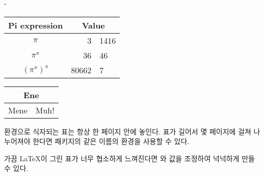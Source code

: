\begin{adjustwidth}{0pt}{-\margheadwidth}

\begin{example}
\begin{tabular}{c r @{.} l}
Pi expression       &
\multicolumn{2}{c}{Value} \\
\hline
$\pi$               & 3&1416  \\
$\pi^{\pi}$         & 36&46   \\
$(\pi^{\pi})^{\pi}$ & 80662&7 \\
\end{tabular}
\end{example}

\vspace{-.5\onelineskip}

\begin{example}
\begin{tabular}{|c|c|}
\hline
\multicolumn{2}{|c|}{Ene} \\
\hline
Mene & Muh! \\
\hline
\end{tabular}
\end{example}

 환경으로 식자되는 표는 항상 한 페이지 안에 놓인다. 표가 길어서 몇 페이지에 걸쳐
나누어져야 한다면  패키지의 같은 이름의 환경을 사용할 수 있다.

가끔 \LaTeX 이 그린 표가 너무 협소하게 느껴진다면 와  값을
조정하여 넉넉하게 만들 수 있다.


\end{adjustwidth}
